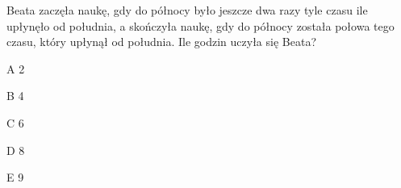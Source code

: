 \begin{tresc}
Beata zaczęła naukę, gdy do północy było jeszcze dwa razy tyle czasu ile upłynęło od południa, a skończyła naukę, gdy do północy została połowa tego czasu, który upłynął od południa. Ile godzin uczyła się Beata?
\end{tresc}
\begin{wariant}{A} 2 \end{wariant}
\begin{wariant}{B} 4 \end{wariant}
\begin{wariant}{C} 6 \end{wariant}
\begin{wariant}{D} 8 \end{wariant}
\begin{wariant}{E} 9 \end{wariant}
